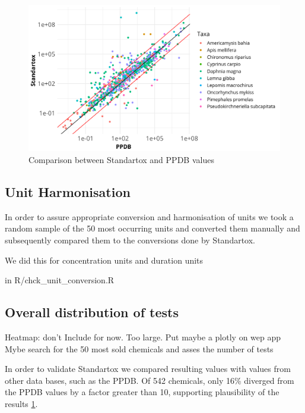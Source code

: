 \begin{figure}
    \includegraphics[width=1\linewidth]{article/figures/gg_ppdb_stan_compare_continous.png}
    \caption{Comparison between Standartox and PPDB values}
    \label{fig:standartox_ppdb_diff}
\end{figure}

\subsection{Unit Harmonisation}

In order to assure appropriate conversion and harmonisation of units we took a random sample of the 50 most occurring units and converted them manually and subsequently compared them to the conversions done by Standartox.

We did this for concentration units and duration units

in R/chck\_unit\_conversion.R


\subsection{Overall distribution of tests}
Heatmap: don't Include for now. Too large.
Put maybe a plotly on wep app
Mybe search for the 50 most sold chemicals and asses the number of tests


In order to validate Standartox we compared resulting values with values from other data bases, such as the PPDB. Of 542 chemicals, only 16\% diverged from the PPDB values by a factor greater than 10, supporting plausibility of the \standartox results \ref{fig:standartox_ppdb_diff}.


